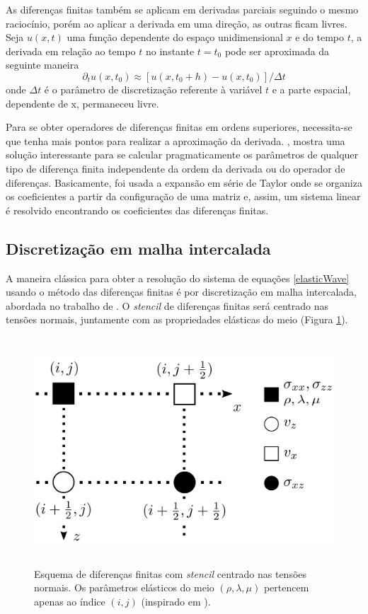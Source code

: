 \documentclass[
	12pt,				%
	openright,			%
	oneside,			%
	a4paper,			%
	english,			%
	brazil				%
	]{abntex2}
\begin{document}
%	
 	As diferenças finitas também se aplicam em derivadas parciais seguindo o mesmo raciocínio, porém ao aplicar a derivada em uma direção, as outras ficam livres. Seja $u(x,t)$ uma função dependente do espaço unidimensional $x$ e do tempo $t$, a derivada em relação ao tempo $t$ no instante $t = t_0$ pode ser aproximada da seguinte maneira    
%
 	\begin{equation}
 		\partial_t u(x,t_0)	\approx \left[u(x,t_0+h) - u(x,t_0)\right] / \Delta t
 	\end{equation}  
%	
	\noindent onde $\Delta t$ é o parâmetro de discretização referente à variável $t$ e a parte espacial, dependente de x, permaneceu livre.

	Para se obter operadores de diferenças finitas em ordens superiores, necessita-se que tenha mais pontos para realizar a aproximação da derivada. , mostra uma solução interessante para se calcular pragmaticamente os parâmetros de qualquer tipo de diferença finita independente da ordem da derivada ou do operador de diferenças. Basicamente, foi usada a expansão em série de Taylor onde se organiza os coeficientes a partir da configuração de uma matriz e, assim, um sistema linear é resolvido encontrando os coeficientes das diferenças finitas. 
	
\subsection*{Discretização em malha intercalada}
	
	A maneira clássica para obter a resolução do sistema de equações \ref{elasticWave} usando o método das diferenças finitas é por discretização em malha intercalada, abordada no trabalho de . O \textit{stencil} de diferenças finitas será centrado nas tensões normais, juntamente com as propriedades elásticas do meio (Figura \ref{staggeredGrid}).
%    
    \begin{figure}[htp!]
		\centering
		\includegraphics[width=13cm,height=8.5cm]{../imagens/staggeredGrid.png}
		\caption{Esquema de diferenças finitas com \textit{stencil} centrado nas tensões normais. Os parâmetros elásticos do meio $(\rho,\lambda,\mu)$ pertencem apenas ao índice $(i,j)$ (inspirado em ).}
		\label{staggeredGrid}
	\end{figure}
\end{document}
